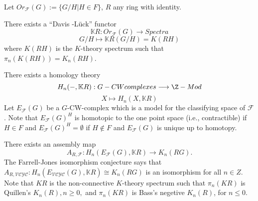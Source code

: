 Let $Or_{\mathcal{F}}(G):= \{G/H| H \in F\} $, $R$ any ring with identity.

There exists a “Davis -L\"{u}ck” functor
\[\mathbb{K}R : Or_{\mathcal{F}}(G) \longrightarrow Spectra \]
\[G/H\mapsto \mathbb{K}R(G/H)=K(RH)\]
where $K(RH)$ is the $K$-theory spectrum such that $\pi_n(K(RH)) = K_n(RH)$.

There exists a homology theory 
\[H_n(-,\mathbb{K}R):G-CWcomplexes\longrightarrow \Z-Mod\]
\[X \mapsto H_n(X,\mathbb{K}R)\] 
Let $E_\mathcal{F}(G)$ be a $G$-CW-complex which is a model for the classifying space of $\mathcal{F}$. 
Note that $E_\mathcal{F}(G)^H$ is homotopic to the one point space (i.e., contractible) if $H\in F$ and $E_\mathcal{F}(G)^H=\emptyset$ if $H\notin F$ and $E_\mathcal{F}(G)$ is unique up to homotopy.

There exists an assembly map
\[A_{R,\mathcal{F}}:H_n(E_\mathcal{F}(G),\mathbb{K}R ) \longrightarrow K_n(RG) .\]
The Farrell-Jones isomorphism conjecture says that $A_{R,\mathcal{VCYC}}:H_n(E_\mathcal{VCYC}(G),\mathbb{K}R ) \cong K_n(RG)$ is an isomorphism for all $n\in Z$. Note that $KR$ is the non-connective $K$-theory spectrum such that $\pi_n(KR)$ is Quillen's $K_n(R),n\geq 0,$ and $\pi_n(KR)$ is Bass's negetive $K_n(R)$, for $n \leq 0$.
